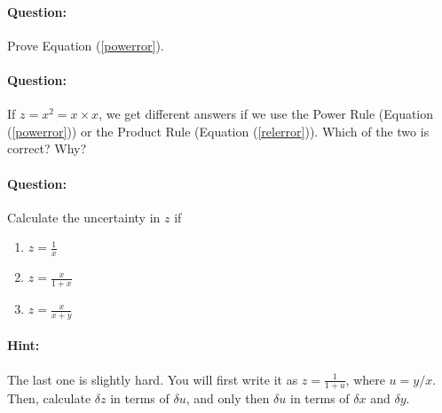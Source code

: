 \begin{question}
\paragraph{Question:} Prove Equation (\ref{powerror}).

\paragraph{Question:} If $z = x^2 = x \times x$, we get different answers if we use the Power Rule (Equation (\ref{powerror})) or the Product Rule (Equation (\ref{relerror})). Which of the two is correct? Why? 

\paragraph{Question:} Calculate the uncertainty in $z$ if
\begin{enumerate}
    \item $z = \frac{1}{x}$
    \item $z = \frac{x}{1+x}$
    \item $z = \frac{x}{x+y}$
\end{enumerate}
\paragraph{Hint:} The last one is slightly hard. You will first write it as $z = \frac{1}{1 + u}$, where $u = y/x$. Then, calculate $\delta z$ in terms of $\delta u$, and only then $\delta u$ in terms of $\delta x$ and $\delta y$.
\end{question}

